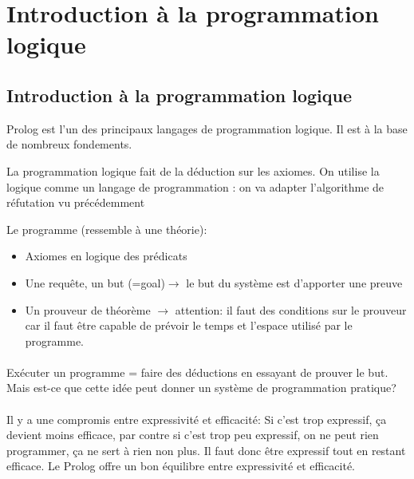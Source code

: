 \section{Introduction à la programmation logique}
\label{p2}
\subsection{Introduction à la programmation logique}

Prolog est l’un des principaux langages de programmation logique. Il est à la base de nombreux fondements. 

La programmation logique fait de la déduction sur les axiomes.
On utilise la logique comme un langage de programmation : on va adapter l’algorithme de réfutation vu précédemment

Le programme (ressemble à une théorie):
\begin{itemize}
	\item Axiomes en logique des prédicats
	\item Une requête, un but (=goal)$\rightarrow$ le but du système est d'apporter une preuve
	\item Un prouveur de théorème $\rightarrow$ attention: il faut des conditions sur le prouveur car il faut être capable de prévoir le temps et l’espace utilisé par le programme.
\end{itemize}

\paragraph{}
Exécuter un programme = faire des déductions en essayant de prouver le but. Mais est-ce que cette idée peut donner un système de programmation pratique?

\paragraph{}
Il y a une compromis entre expressivité et efficacité: Si c’est trop expressif, ça devient moins efficace, par contre si c’est trop peu expressif, on ne peut rien programmer, ça ne sert à rien non plus. Il faut donc être expressif tout en restant efficace. Le Prolog offre un bon équilibre entre expressivité et efficacité.

